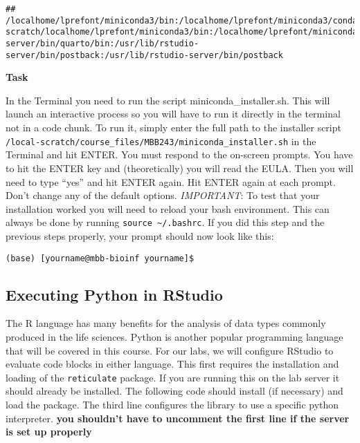 \documentclass[
]{article}
\newenvironment{Shaded}{\begin{snugshade}}{\end{snugshade}}
\newcommand{\BuiltInTok}[1]{#1}
\newcommand{\VariableTok}[1]{\textcolor[rgb]{0.00,0.00,0.00}{#1}}
\begin{document}
\begin{Shaded}
\end{Shaded}

\begin{verbatim}
## /localhome/lprefont/miniconda3/bin:/localhome/lprefont/miniconda3/condabin:/localhome/lprefont/.local/bin:/localhome/lprefont/bin:/local-scratch/localhome/lprefont/miniconda3/bin:/localhome/lprefont/miniconda3/condabin:/usr/local/sbin:/usr/local/bin:/usr/sbin:/usr/bin:/usr/lib/rstudio-server/bin/quarto/bin:/usr/lib/rstudio-server/bin/postback:/usr/lib/rstudio-server/bin/postback
\end{verbatim}

\textbf{Task}

In the Terminal you need to run the script miniconda\_installer.sh. This
will launch an interactive process so you will have to run it directly
in the terminal not in a code chunk. To run it, simply enter the full
path to the installer script
\texttt{/local-scratch/course\_files/MBB243/miniconda\_installer.sh} in
the Terminal and hit ENTER. You must respond to the on-screen prompts.
You have to hit the ENTER key and (theoretically) you will read the
EULA. Then you will need to type ``yes'' and hit ENTER again. Hit ENTER
again at each prompt. Don't change any of the default options.
\emph{IMPORTANT}: To test that your installation worked you will need to
reload your bash environment. This can always be done by running
\texttt{source\ \textasciitilde{}/.bashrc}. If you did this step and the
previous steps properly, your prompt should now look like this:

\texttt{(base)\ {[}yourname@mbb-bioinf\ yourname{]}\$}

\hypertarget{executing-python-in-rstudio}{%
\subsection{Executing Python in
RStudio}\label{executing-python-in-rstudio}}

The R language has many benefits for the analysis of data types commonly
produced in the life sciences. Python is another popular programming
language that will be covered in this course. For our labs, we will
configure RStudio to evaluate code blocks in either language. This first
requires the installation and loading of the \texttt{reticulate}
package. If you are running this on the lab server it should already be
installed. The following code should install (if necessary) and load the
package. The third line configures the library to use a specific python
interpreter. \textbf{you shouldn't have to uncomment the first line if
the server is set up properly}
\end{document}
